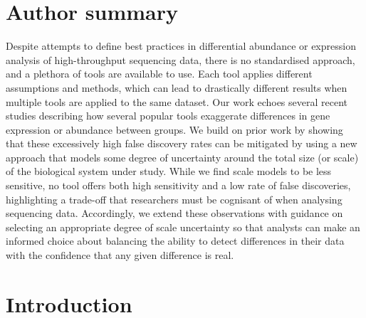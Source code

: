 \documentclass[10pt,letterpaper]{article}
\begin{document}

%
\section*{Author summary}
Despite attempts to define best practices in differential abundance or expression analysis of high-throughput sequencing data, there is no standardised approach, and a plethora of tools are available to use. Each tool applies different assumptions and methods, which can lead to drastically different results when multiple tools are applied to the same dataset. Our work echoes several recent studies describing how several popular tools exaggerate differences in gene expression or abundance between groups. We build on prior work by showing that these excessively high false discovery rates can be mitigated by using a new approach that models some degree of uncertainty around the total size (or scale) of the biological system under study. While we find scale models to be less sensitive, no tool offers both high sensitivity and a low rate of false discoveries, highlighting a trade-off that researchers must be cognisant of when analysing sequencing data. Accordingly, we extend these observations with guidance on selecting an appropriate degree of scale uncertainty so that analysts can make an informed choice about balancing the ability to detect differences in their data with the confidence that any given difference is real.

\linenumbers


\section*{Introduction}
\end{document}
